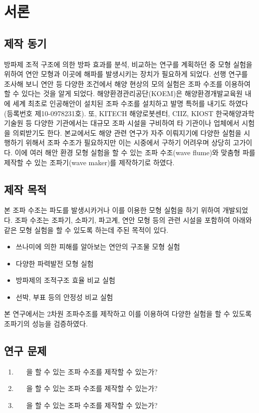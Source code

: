 \section{서론}


\subsection{제작 동기}

방파제 조적 구조에 의한 방파 효과를 분석, 비교하는 연구를 계획하던 중 모형 실험을 위하여 연안 모형과 이곳에 해파를 발생시키는 장치가 필요하게 되었다. 선행 연구를 조사해 보니 연안 등 다양한 조건에서 해양 현상의 모의 실험은 조파 수조를 이용하여 할 수 있다는 것을 알게 되었다\cite{chung2013}. 해양환경관리공단(KOEM)은 해양환경개발교육원 내에 세계 최초로 인공해안이 설치된 조파 수조를 설치하고 발명 특허를 내기도 하였다 (등록번호 제10-0978231호). 또, KITECH 해양로봇센터, CIIZ, KIOST 한국해양과학기술원 등 다양한 기관에서는 대규모 조파 시설을 구비하여 타 기관이나 업체에서 시험을 의뢰받기도 한다. 본교에서도 해양 관련 연구가 자주 이뤄지기에 다양한 실험을 시행하기 위해서 조파 수조가 필요하지만 이는 시중에서 구하기 어려우며 상당히 고가이다. 이에 여러 해안 환경 모형 실험을 할 수 있는 조파 수조(wave flume)와 맞춤형 파를 제작할 수 있는 조파기(wave maker)를 제작하기로 하였다. 


\subsection{제작 목적}

본 조파 수조는 파도를 발생시카거나 이를 이용한 모형 실험을 하기 위하여 개발되었다. 조파 수조는 조파기, 소파기, 파고계, 연안 모형 등의 관련 시설을 포함하여 아래와 같은 모형 실험을 할 수 있도록 하는데 주된 목적이 있다.

\begin{itemize}
    \item 쓰나미에 의한 피해를 알아보는 연안의 구조물 모형 실험
    \item 다양한 파력발전 모형 실험
    \item 방파제의 조적구조 효율 비교 실험
    \item 선박, 부표 등의 안정성 비교 실험
\end{itemize}

본 연구에서는 2차원 조파수조를 제작하고 이를 이용하여 다양한 실험을 할 수 있도록 조파기의 성능을 검증하였다.

\subsection{연구 문제}

\begin{enumerate}
    \item ~~~을 할 수 있는 조파 수조를 제작할 수 있는가?
    \item ~~~을 할 수 있는 조파 수조를 제작할 수 있는가?
    \item ~~~을 할 수 있는 조파 수조를 제작할 수 있는가?
\end{enumerate}

